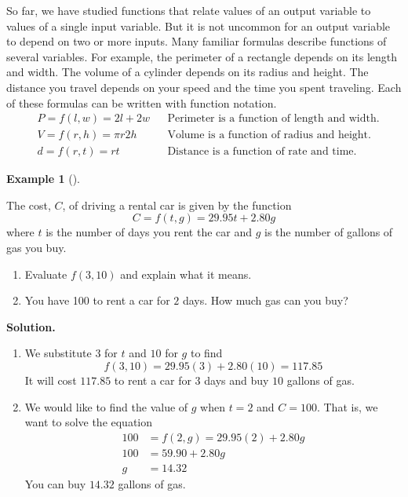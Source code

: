\documentclass[10pt,]{book}
\theoremstyle{plain}
\theoremstyle{definition}
\theoremstyle{definition}
\theoremstyle{definition}
\newtheorem{example}[theorem]{Example}
\theoremstyle{definition}
\theoremstyle{definition}
\numberwithin{equation}{section}
\newcommand{\amp}{ & }
\begin{document}
    So far, we have studied functions that relate values of an output variable to values of a single input variable. But it is not uncommon for an output variable to depend on two or more inputs. Many familiar formulas describe functions of several variables. For example, the perimeter of a rectangle depends on its length and width. The volume of a cylinder depends on its radius and height. The distance you travel depends on your speed and the time you spent traveling. Each of these formulas can be written with function notation.
    \begin{align*}
    \amp P = f (l,w) = 2l + 2w \amp\amp \text{Perimeter is a function of length and width.}\\
    \amp V = f (r, h) = πr 2h \amp\amp \text{Volume is a function of radius and height.}\\
    \amp d = f (r, t) = rt \amp\amp \text{Distance is a function of rate and time.}
    \end{align*}
%
\begin{example}[]\label{example-rental-car}

    The cost, \(C\), of driving a rental car is given by the function
    \begin{equation*}C = f (t, g) = 29.95t + 2.80g\end{equation*}
    where \(t\) is the number of days you rent the car and \(g\) is the number of gallons of gas you buy.
%
\leavevmode%
\begin{enumerate}[label=*\alph**]
\item\hypertarget{li-560}{}Evaluate \(f (3,10)\) and explain what it means.\item\hypertarget{li-561}{}You have \textdollar{}100 to rent a car for \(2\) days. How much gas can you buy?\end{enumerate}
\par\medskip\noindent%
\textbf{Solution.}\quad \leavevmode%
\begin{enumerate}[label=*\alph**]
\item\hypertarget{li-562}{}We substitute \(3\) for \(t\) and \(10\) for \(g\) to find
        \begin{equation*}f (3, 10) = 29.95(3) + 2.80(10) = 117.85\end{equation*}
        It will cost \textdollar{}\(117.85\) to rent a car for \(3\) days and buy \(10\) gallons of gas.\item\hypertarget{li-563}{}We would like to find the value of \(g\) when \(t = 2\) and \(C = 100\). That is, we want to solve the equation
        \begin{align*}
        100 \amp = f (2, g) = 29.95(2) + 2.80g \\
        100 \amp = 59.90 + 2.80g \\
        g \amp = 14.32
        \end{align*}
        You can buy \(14.32\) gallons of gas.
    \end{enumerate}
\end{example}
\end{document}
